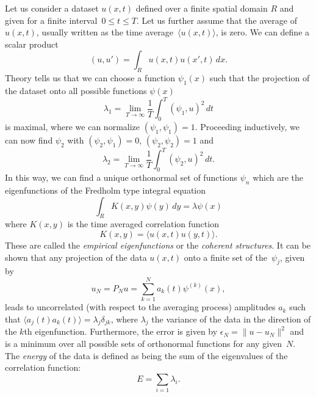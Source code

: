 Let us consider a dataset
$u(x,t)$ defined over a finite spatial domain $R$ and given for a finite
interval~$0\le t\le T$. Let us further assume that the average of $u(x,t)$,
usually written as the time average~$\langle u(x,t) \rangle$, 
is zero. We can define a scalar product
\begin{equation}
(u,u') = \int_{R} u(x,t) u(x',t)\, dx.
\end{equation}
Theory tells us that we can choose a function $\psi_1(x)$ such that
the projection of the dataset onto all possible functions $\psi(x)$
\begin{equation}
\lambda_1 = \lim_{T \rightarrow \infty} \frac{1}{T}
	\int_{0}^{T} (\psi_1,u)^2\, dt
\label{eq:variation}
\end{equation}
is maximal, where we can normalize $(\psi_1,\psi_1) = 1$.
Proceeding inductively,
we can now find $\psi_2$ with $(\psi_2,\psi_1) = 0$, $(\psi_2,\psi_2) =1$ and
\begin{equation}
\lambda_2 = \lim_{T \rightarrow \infty} \frac{1}{T}
	\int_{0}^{T} (\psi_2,u)^2\, dt.
\end{equation}
In this way, we can find a unique orthonormal set of functions
$\psi_n$ which are the eigenfunctions of the Fredholm type integral equation
\begin{equation}
\int_R K(x,y) \psi(y)\, dy = \lambda \psi(x)
\end{equation}
where $ K(x,y)$ is the time averaged correlation function
\begin{equation}
K(x,y) = \langle u(x,t) u(y,t)\rangle.
\end{equation}
These are called the {\sl empirical eigenfunctions} or
the {\sl coherent structures}.
It can be shown that any projection of the data $u(x,t)$
onto a finite set of the~$\psi_j$, given by
\begin{displaymath}
u_N = P_N u = \sum_{k=1}^{N} a_k(t) \psi^{(k)} (x),
\end{displaymath}
leads to uncorrelated (with respect to the averaging process) amplitudes
$a_k$ such that
$\langle a_j(t) a_k(t)\rangle = \lambda_j \delta_{jk}$,
where $\lambda_j$ the 
variance of the data in the direction of the $k$th eigenfunction.
Furthermore, the error is given by
$\epsilon_N = \|u - u_N\|^2$ and is a minimum over all
possible sets of orthonormal functions for any given~$N$. 
The {\sl energy} of the data is defined as being the sum of the
eigenvalues of the correlation function:
\begin{equation}
E = \sum_{i=1} {\lambda}_i.
\end{equation}
